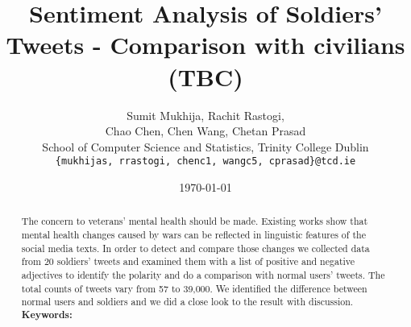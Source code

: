 \documentclass[english,a4paper,11pt]{article}
\title{Sentiment Analysis of Soldiers' Tweets - Comparison with civilians (TBC)}
\date{\today}
\author{
  Sumit Mukhija, Rachit Rastogi,\\
  Chao Chen, Chen Wang, Chetan Prasad\\
  School of Computer Science and Statistics, Trinity College Dublin\\
  \texttt{\{mukhijas, rrastogi, chenc1, wangc5, cprasad\}@tcd.ie}
}
\begin{document}
\maketitle
\thispagestyle{empty}
\pagestyle{empty}

\begin{abstract}
  The concern to veterans' mental health should be made. Existing works show that
  mental health changes caused by wars can be reflected in linguistic features of
  the social media texts. In order to detect and compare those changes we collected
  data from 20 soldiers' tweets and examined them with a list of positive and negative
  adjectives to identify the polarity and do a comparison with normal users'
  tweets. The total counts of tweets vary from 57 to 39,000. We identified the
  difference between normal users and soldiers and we did a close look to the
  result with discussion. \\
  \textbf{Keywords:}
\end{abstract}










\end{document}
